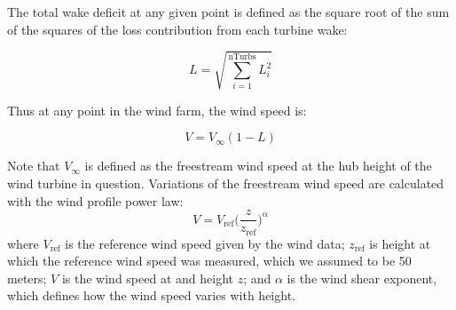 The total wake deficit at any given point is defined as the square root of the sum of the squares of the loss contribution from each turbine wake:

\begin{equation}
L = \sqrt{\sum_{i=1}^\text{nTurbs}L_i^2}
\end{equation}

\noindent Thus at any point in the wind farm, the wind speed is:

\begin{equation}
V = V_\infty(1-L)
\end{equation}

\noindent Note that $V_\infty$ is defined as the freestream wind speed at the hub height of the wind turbine in question. Variations of the freestream wind speed are calculated with the wind profile power law: 
\begin{equation}
V = V_{\text{ref}}\Big(\frac{z}{z_{\text{ref}}}\Big)^\alpha
\label{Eq:shear}
\end{equation}
where $V_{\text{ref}}$ is the reference wind speed given by the wind data; $z_{\text{ref}}$ is height at which the reference wind speed was measured, which we assumed to be 50 meters; $V$ is the wind speed at and height $z$; and $\alpha$ is the wind shear exponent, which defines how the wind speed varies with height.
